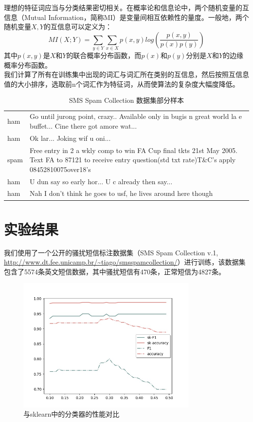 \documentclass[a4paper, twocolumn, 12pt]{article}
\begin{document}
理想的特征词应当与分类结果密切相关。在概率论和信息论中，两个随机变量的互信息（Mutual Information，简称MI）是变量间相互依赖性的量度。一般地，两个随机变量$X, Y$的互信息可以定义为：
\[MI(X; Y)=\sum_{y\in Y}\sum_{x\in X}p(x, y)log(\frac{p(x, y)}{p(x)p(y)})\]
其中$p(x,y)$是$X$和$Y$的联合概率分布函数，而$p(x)$和$p(y)$分别是$X$和$Y$的边缘概率分布函数。\\

我们计算了所有在训练集中出现的词汇与词汇所在类别的互信息，然后按照互信息值的大小排序，选取前n个词汇作为特征词，从而使算法的复杂度大幅度降低。

\begin{table}[hbtp]
    \centering
    \caption{SMS Spam Collection 数据集部分样本}
    \begin{tabular}{lp{14cm}}
        \hline
        ham&	Go until jurong point, crazy.. Available only in bugis n great world la e buffet... Cine there got amore wat...\\
        ham&	Ok lar... Joking wif u oni...\\
        spam&	Free entry in 2 a wkly comp to win FA Cup final tkts 21st May 2005. Text FA to 87121 to receive entry question(std txt rate)T\&C's apply 08452810075over18's\\
        ham&	U dun say so early hor... U c already then say...\\
        ham&	Nah I don't think he goes to usf, he lives around here though\\
        \hline
    \end{tabular}
    \end{table}

\section{实验结果}
我们使用了一个公开的骚扰短信标注数据集（SMS Spam Collection v.1, \url{http://www.dt.fee.unicamp.br/~tiago/smsspamcollection/}）进行训练，该数据集包含了5574条英文短信数据，其中骚扰短信有470条，正常短信为4827条。\\
[2ex]
\begin{figure}
    \centering
    \includegraphics[width=0.8\textwidth]{fig_1.jpg}
    \caption{与sklearn中的分类器的性能对比}
\end{figure}
\end{document}
